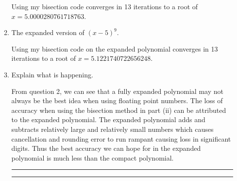 \documentclass[a4paper,10pt]{article}
\begin{document}
\begin{enumerate}[label = \arabic*.)]
\begin{enumerate}[label = \roman*.]
                    Using my bisection code converges in 13 iterations to a root of $ x = 5.0000280761718763 $.
                    
                    \item The expanded version of $(x - 5)^9$.
                    
                    Using my bisection code on the expanded  polynomial converges in 13 iterations to a root of $ x = 5.1221740722656248 $.
                    
                    \item Explain what is happening.
                    
                    From question 2, we can see that a fully expanded polynomial may not always be the best idea when using floating point numbers. The loss of accuracy when using the bisection method in part (ii) can be attributed to the expanded polynomial. The expanded polynomial adds and subtracts relatively large and relatively small numbers which causes cancellation and rounding error to run rampant causing loss in significant digits. Thus the best accuracy we can hope for in the expanded polynomial is much less than the compact polynomial.
                    
                    
                    \rule{\textwidth}{0.4pt}
                    
                    \rule{\textwidth}{0.4pt}
                \end{enumerate} 
\end{enumerate}
\end{document}
